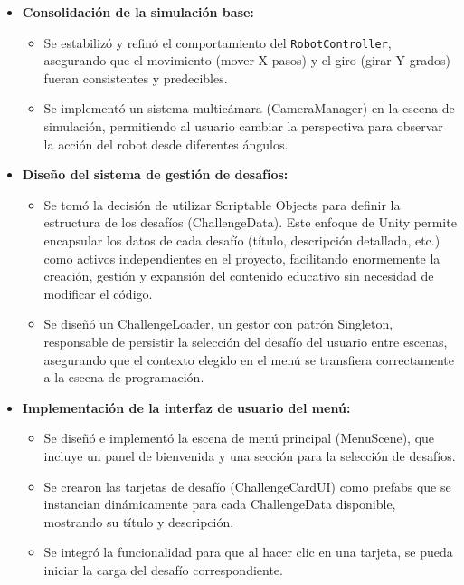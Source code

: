 \begin{itemize}
	\item \textbf{Consolidación de la simulación base:}
	\begin{itemize}
		\item Se estabilizó y refinó el comportamiento del \texttt{RobotController}, asegurando que el movimiento (mover X pasos) y el giro (girar Y grados) fueran consistentes y predecibles.
		\item Se implementó un sistema multicámara (CameraManager) en la escena de simulación, permitiendo al usuario cambiar la perspectiva para observar la acción del robot desde diferentes ángulos.
	\end{itemize}
	
	\item \textbf{Diseño del sistema de gestión de desafíos:}
	\begin{itemize}
		\item Se tomó la decisión de utilizar Scriptable Objects para definir la estructura de los desafíos (ChallengeData). Este enfoque de Unity permite encapsular los datos de cada desafío (título, descripción detallada, etc.) como activos independientes en el proyecto, facilitando enormemente la creación, gestión y expansión del contenido educativo sin necesidad de modificar el código.
		\item Se diseñó un ChallengeLoader, un gestor con patrón Singleton, responsable de persistir la selección del desafío del usuario entre escenas, asegurando que el contexto elegido en el menú se transfiera correctamente a la escena de programación.
	\end{itemize}
	
	\item \textbf{Implementación de la interfaz de usuario del menú:}
	\begin{itemize}
		\item Se diseñó e implementó la escena de menú principal (MenuScene), que incluye un panel de bienvenida y una sección para la selección de desafíos.
		\item Se crearon las tarjetas de desafío (ChallengeCardUI) como prefabs que se instancian dinámicamente para cada ChallengeData disponible, mostrando su título y descripción.
		\item Se integró la funcionalidad para que al hacer clic en una tarjeta, se pueda iniciar la carga del desafío correspondiente.
	\end{itemize}
	

\end{itemize}
